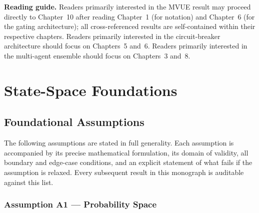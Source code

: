 \documentclass[12pt,openany]{book}
\numberwithin{equation}{chapter}
\theoremstyle{plain}
\theoremstyle{definition}
\theoremstyle{remark}
\begin{document}
\medskip
\noindent
\textbf{Reading guide.}
Readers primarily interested in the MVUE result may proceed
directly to Chapter~10 after reading Chapter~1 (for notation)
and Chapter~6 (for the gating architecture); all cross-referenced
results are self-contained within their respective chapters.
Readers primarily interested in the circuit-breaker architecture
should focus on Chapters~5 and~6.  Readers primarily interested
in the multi-agent ensemble should focus on Chapters~3 and~8.

\chapter{State-Space Foundations}
\label{ch:state-space}

\section{Foundational Assumptions}

\noindent
The following assumptions are stated in full generality.  Each
assumption is accompanied by its precise mathematical
formulation, its domain of validity, all boundary and edge-case
conditions, and an explicit statement of what fails if the
assumption is relaxed.  Every subsequent result in this
monograph is auditable against this list.

\subsection*{Assumption A1 — Probability Space}
\end{document}
